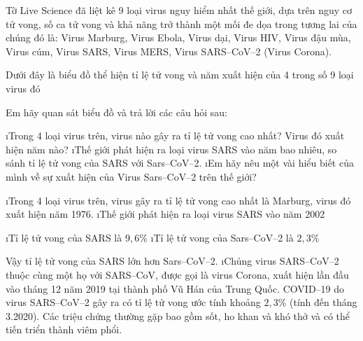\begin{bt}
	Tờ Live Science đã liệt kê 9 loại virus nguy hiểm nhất thế giới, dựa trên nguy cơ tử vong, số ca tử vong và khả năng trở thành một mối đe dọa trong tương lai của chúng đó là: Virus Marburg, Virus Ebola, Virus dại, Virus HIV, Virus đậu mùa, Virus cúm, Virus SARS, Virus MERS, Virus SARS--CoV--2 (Virus Corona). 
	
	Dưới đây là biểu đồ thể hiện tỉ lệ tử vong và năm xuất hiện của 4 trong số 9 loại virus đó
	
	Em hãy quan sát biểu đồ và trả lời các câu hỏi sau:
	\begin{enumerate}[a),leftmargin=*]
		\i Trong 4 loại virus trên, virus nào gây ra tỉ lệ tử vong cao nhất? Virus đó xuất hiện năm nào?
		\i Thế giới phát hiện ra loại virus SARS vào năm bao nhiêu, so sánh tỉ lệ tử vong của SARS với Sars--CoV--2.
		\i Em hãy nêu một vài hiểu biết của mình về sự xuất hiện của Virus Sars--CoV--2 trên thế giới? 
	\end{enumerate}
	\begin{loigiaichuong42}
		\begin{enumerate}[a),leftmargin=*]
			\i Trong 4 loại virus trên, virus gây ra tỉ lệ tử vong cao nhất là Marburg, virus đó xuất hiện năm 1976.
			\i Thế giới phát hiện ra loại virus SARS vào năm 2002
			\begin{enumerate}[+,leftmargin=*]
				\i Tỉ lệ tử vong của SARS là  $9,6\%$ 
				\i Tỉ lệ tử vong của Sars--CoV--2 là $2,3 \%$ 
			\end{enumerate}
			Vậy tỉ lệ tử vong của SARS lớn hơn Sars--CoV--2.
			\i Chủng virus SARS--CoV--2 thuộc cùng một họ với SARS--CoV, được gọi là virus Corona, xuất hiện lần đầu vào tháng 12 năm 2019 tại thành phố Vũ Hán của Trung Quốc. COVID--19 do virus SARS--CoV--2 gây ra có tỉ lệ tử vong ước tính khoảng $2,3\%$ (tính đến tháng 3.2020). Các triệu chứng thường gặp bao gồm sốt, ho khan và khó thở và có thể tiến triển thành viêm phổi.
		\end{enumerate}
	\end{loigiaichuong42}
\end{bt}
